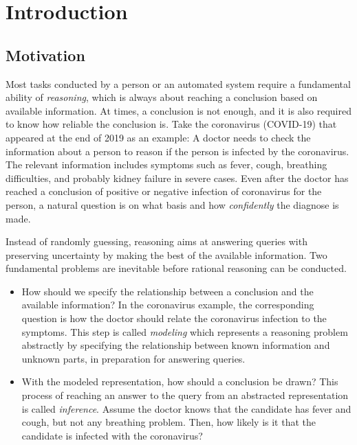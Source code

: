 \chapter{Introduction}
\label{chapter1}

\section{Motivation}
\label{section1.1}

Most tasks conducted by a person or an automated system require a fundamental ability of \textit{reasoning}, which is always about reaching a conclusion based on available information. At times, a conclusion is not enough, and it is also required to know how reliable the conclusion is. Take the coronavirus (COVID-19) that appeared at the end of 2019 as an example: A doctor needs to check the information about a person to reason if the person is infected by the coronavirus. The relevant information includes symptoms such as fever, cough, breathing difficulties, and probably kidney failure in severe cases. Even after the doctor has reached a conclusion of positive or negative infection of coronavirus for the person, a natural question is on what basis and how \textit{confidently} the diagnose is made.

Instead of randomly guessing, reasoning aims at answering queries with preserving uncertainty by making the best of the available information. Two fundamental problems are inevitable before rational reasoning can be conducted. 
\begin{itemize}
\item How should we specify the relationship between a conclusion and the available information? In the coronavirus example, the corresponding question is how the doctor should relate the coronavirus infection to the symptoms. This step is called \textit{modeling} which represents a reasoning problem abstractly by specifying the relationship between known information and unknown parts, in preparation for answering queries.
\item With the modeled representation, how should a conclusion be drawn? This process of reaching an answer to the query from an abstracted representation is called \textit{inference}. Assume the doctor knows that the candidate has fever and cough, but not any breathing problem. Then, how likely is it that the candidate is infected with the coronavirus?
\end{itemize}

